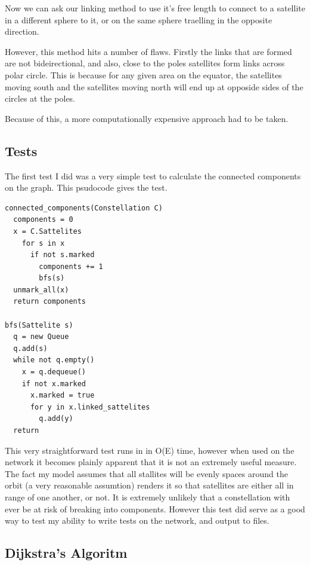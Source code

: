\documentclass[12pt]{article}
\begin{document}
Now we can ask our linking method to use it's free length to connect to a satellite in a different sphere to it, or on the same sphere traelling in the opposite direction.

However, this method hits a number of flaws. Firstly the links that are formed are not bideirectional, and also, close to the poles satellites form links across polar circle. This is because for any given area on the equator, the satellites moving south and the satellites moving north will end up at opposide sides of the circles at the poles.


Because of this, a more computationally expensive approach had to be taken.


\subsection{Tests}

The first test I did was a very simple test to calculate the connected components on the graph. This psudocode gives the test.

\begin{lstlisting}
connected_components(Constellation C)
  components = 0
  x = C.Sattelites
    for s in x
      if not s.marked
        components += 1
        bfs(s)
  unmark_all(x)
  return components

bfs(Sattelite s)
  q = new Queue
  q.add(s)
  while not q.empty()
    x = q.dequeue()
    if not x.marked
      x.marked = true
      for y in x.linked_sattelites
        q.add(y)
  return			
\end{lstlisting}

This very straightforward test runs in in O(E) time, however when used on the network it becomes plainly apparent that it is not an extremely useful measure. The fact my model assumes that all stallites will be evenly spaces around the orbit (a very reasonable assumtion) renders it so that satellites are either all in range of one another, or not. It is extremely unlikely that a constellation with ever be at risk of breaking into components. However this test did serve as a good way to test my ability to write tests on the network, and output to files.

\subsection{Dijkstra's Algoritm}
\end{document}

